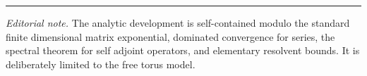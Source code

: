 \vspace{.25in}
\begin{center}\color{cyan}\rule{.28\linewidth}{.7pt}\end{center}
\vspace{.12in}
{\footnotesize\color{ash} \textit{Editorial note.} The analytic development is self-contained modulo the standard finite dimensional matrix exponential, dominated convergence for series, the spectral theorem for self adjoint operators, and elementary resolvent bounds. It is deliberately limited to the free torus model.}
